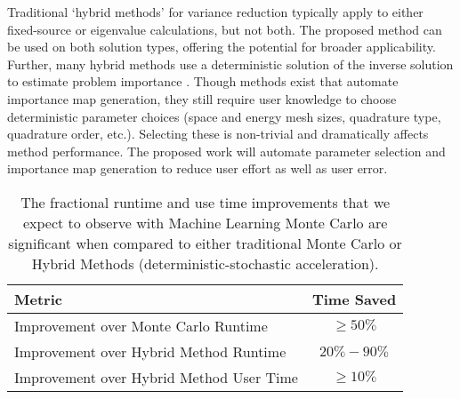 \documentclass[letterpaper,12pt]{article}
\begin{document}
Traditional `hybrid methods' for variance 
reduction typically apply to either fixed-source or eigenvalue calculations, but not both.
The proposed method can be used on both solution types, offering the potential for
broader applicability. Further, many hybrid
methods use a deterministic solution of the inverse solution to estimate problem
importance\cite{wagner_automated_1998, wagner_automated_2009,
haghighat_monte_2003, zhang_adjoint-based_2011, hoogenboom_optimum_1979} . Though methods exist that automate importance map
generation\cite{hendricks_mcnp_1985, burn_optimizing_2014,
  van_wijk_easy_2011, wagner_automated_1998, wagner_automated_2009,
haghighat_monte_2003, zhang_adjoint-based_2011, hoogenboom_optimum_1979},
they still require user knowledge to choose deterministic
parameter choices (space and energy mesh sizes, quadrature type, quadrature order,
etc.). Selecting these is non-trivial and dramatically affects method 
performance. The proposed work will automate parameter selection
and importance map generation to reduce user effort as well as user error.

\begin{table}
  \centering
    \begin{tabular}{  l  c  }
     \hline
     \textbf{Metric} & \textbf{Time Saved}\\ \hline
     Improvement over Monte Carlo Runtime & $\ge50\%$  \\
     Improvement over Hybrid Method Runtime & $20\%-90\%$ \\
     Improvement over Hybrid Method User Time & $\ge10\%$ \\
     \hline
    \end{tabular}
    \caption{The fractional runtime and use time improvements that we expect  to observe with Machine 
            Learning Monte Carlo are significant when compared to either 
            traditional Monte Carlo or Hybrid Methods (deterministic-stochastic 
            acceleration).}
   \label{tab:improve}
\end{table}
\end{document}
